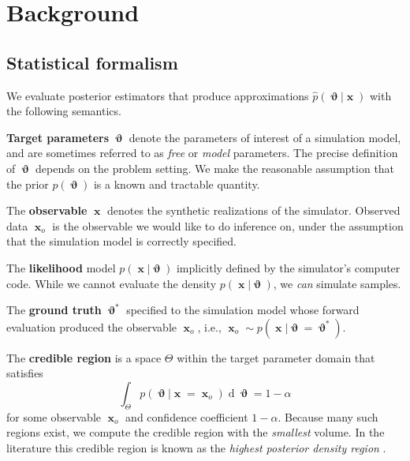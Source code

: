 \documentclass[twoside]{article}
\DeclareMathOperator{\vtheta}{\boldsymbol\vartheta}
\DeclareMathOperator{\vx}{\boldsymbol x}
\renewcommand*{\d}[1]{\operatorname{d}\!{#1}}
\begin{document}
\section{Background}
\label{sec:background}

\subsection{Statistical formalism}
\label{sec:statistical_formalism}
We evaluate posterior estimators that produce approximations $\hat{p}(\vtheta\vert\vx)$ with the following semantics.

{\bf Target parameters} $\vtheta$ denote the parameters of interest of a simulation model, and are sometimes referred to as \emph{free} or \emph{model} parameters. The precise definition of $\vtheta$ depends on the problem setting. We make the reasonable assumption that the prior $p(\vtheta)$ is a known and tractable quantity.

The {\bf observable} $\vx$ denotes the synthetic realizations of the simulator. Observed data $\vx_o$ is the observable we would like to do inference on, under the assumption that the simulation model is correctly specified.

The {\bf likelihood} model $p(\vx\vert\vtheta)$ implicitly defined by the simulator's computer code. While we cannot evaluate the density $p(\vx\vert\vtheta)$, we \emph{can} simulate samples.

The {\bf ground truth} $\vtheta^*$ specified to the simulation model whose forward evaluation produced the observable $\vx_o$, i.e., $\vx_o\sim p(\vx\vert\vtheta=\vtheta^*)$.

The {\bf credible region} is a space $\Theta$ within the target parameter domain that satisfies
\begin{equation}
    \int_\Theta p(\vtheta\vert\vx=\vx_o) \d{\vtheta} = 1 - \alpha
\end{equation}
for some observable $\vx_o$ and confidence coefficient $1 - \alpha$.
Because many such regions exist, we compute the credible region with the \emph{smallest} volume. In the literature this credible region is known as
the \emph{highest posterior density region} \citep{box2011bayesian,hyndman1996computing}.
\end{document}
